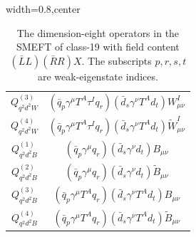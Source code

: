\begin{table}[H]
\begin{center}
\begin{adjustbox}{width=0.8\textwidth,center}
\begin{minipage}[t]{6.1cm}
\begin{tabular}[t]{c|c}
%
$Q_{q^2d^2W}^{(3)}$  &  $(\bar q_p \gamma^\mu T^A \tau^I q_r) (\bar d_s \gamma^\nu T^A d_t) W^I_{\mu\nu}$ \\ 
%
$Q_{q^2d^2W}^{(4)}$  &  $(\bar q_p \gamma^\mu T^A \tau^I q_r) (\bar d_s \gamma^\nu T^A d_t) \widetilde W^I_{\mu\nu}$ \\ 
%
$Q_{q^2d^2B}^{(1)}$  &  $(\bar q_p \gamma^\mu q_r) (\bar d_s \gamma^\nu d_t) B_{\mu\nu}$ \\ 
%
$Q_{q^2d^2B}^{(2)}$  &  $(\bar q_p \gamma^\mu q_r) (\bar d_s \gamma^\nu d_t) \widetilde B_{\mu\nu}$ \\ 
%
$Q_{q^2d^2B}^{(3)}$  &  $(\bar q_p \gamma^\mu T^A q_r) (\bar d_s \gamma^\nu T^A d_t) B_{\mu\nu}$ \\ 
%
$Q_{q^2d^2B}^{(4)}$  &  $(\bar q_p \gamma^\mu T^A q_r) (\bar d_s \gamma^\nu T^A d_t) \widetilde B_{\mu\nu}$
\end{tabular}
\end{minipage}
\end{adjustbox}
\end{center}
\caption{The dimension-eight operators in the SMEFT of class-19 with field content $(\bar L L)(\bar R R) X$. The subscripts $p, r, s, t$ are weak-eigenstate indices.}
\label{tab:smeft8class_19_LLRR}
\end{table}


